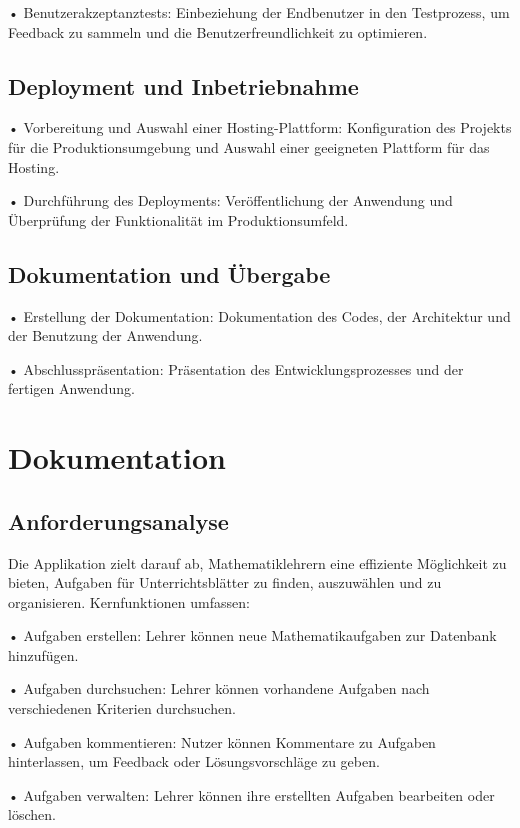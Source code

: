 \documentclass[12pt,a4paper]{article} %
\begin{document}
•	Benutzerakzeptanztests: Einbeziehung der Endbenutzer in den Testprozess, um Feedback zu sammeln und die Benutzerfreundlichkeit zu optimieren.


\subsection{Deployment und Inbetriebnahme}

•	Vorbereitung und Auswahl einer Hosting-Plattform: Konfiguration des Projekts für die Produktionsumgebung und Auswahl einer geeigneten Plattform für das Hosting.

•	Durchführung des Deployments: Veröffentlichung der Anwendung und Überprüfung der Funktionalität im Produktionsumfeld.

\subsection{Dokumentation und Übergabe}

•	Erstellung der Dokumentation: Dokumentation des Codes, der Architektur und der Benutzung der Anwendung.

•	Abschlusspräsentation: Präsentation des Entwicklungsprozesses und der fertigen Anwendung.

\newpage


\section{Dokumentation}

\subsection{Anforderungsanalyse}

Die Applikation zielt darauf ab, Mathematiklehrern eine effiziente Möglichkeit zu bieten, Aufgaben für Unterrichtsblätter zu finden, auszuwählen und zu organisieren. Kernfunktionen umfassen:

•	   Aufgaben erstellen: Lehrer können neue Mathematikaufgaben zur Datenbank hinzufügen.

•	   Aufgaben durchsuchen: Lehrer können vorhandene Aufgaben nach verschiedenen Kriterien durchsuchen.

•	   Aufgaben kommentieren: Nutzer können Kommentare zu Aufgaben hinterlassen, um Feedback oder Lösungsvorschläge zu geben.

•	   Aufgaben verwalten: Lehrer können ihre erstellten Aufgaben bearbeiten oder löschen.
\end{document}
